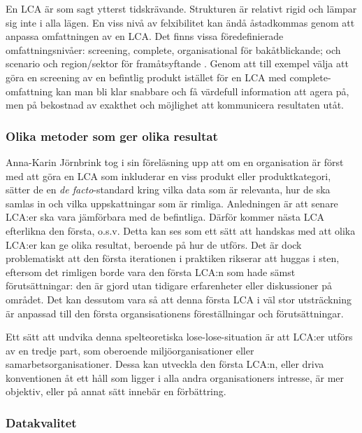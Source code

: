 \documentclass{article}
\begin{document}
En LCA är som sagt ytterst tidskrävande. Strukturen är relativt rigid och lämpar sig inte i alla lägen. En viss nivå av felxibilitet kan ändå åstadkommas genom att anpassa omfattningen av en LCA. Det finns vissa föredefinierade omfattningsnivåer:  screening, complete, organisational för bakåtblickande; och scenario och region/sektor för framåtsyftande . Genom att till exempel välja att göra en screening av en befintlig produkt istället för en LCA med complete-omfattning kan man bli klar snabbare och få värdefull information att agera på, men på bekostnad av exakthet och möjlighet att kommunicera resultaten utåt.

\subsubsection{Olika metoder som ger olika resultat}

Anna-Karin Jörnbrink tog i sin föreläsning upp att om en organisation är först med att göra en LCA som inkluderar en viss produkt eller produktkategori, sätter de en \emph{de facto}-standard kring vilka data som är relevanta, hur de ska samlas in och vilka uppskattningar som är rimliga. Anledningen är att senare LCA:er ska vara jämförbara med de befintliga. Därför kommer nästa LCA efterlikna den första, o.s.v. Detta kan ses som ett sätt att handskas med att olika LCA:er kan ge olika resultat, beroende på hur de utförs. Det är dock problematiskt att den första iterationen i praktiken rikserar att huggas i sten, eftersom det rimligen borde vara den första LCA:n som hade sämst förutsättningar: den är gjord utan tidigare erfarenheter eller diskussioner på området. Det kan dessutom vara så att denna första LCA i väl stor utsträckning är anpassad till den första organsisationens föreställningar och förutsättningar. 

Ett sätt att undvika denna spelteoretiska lose-lose-situation är att LCA:er utförs av en tredje part, som oberoende miljöorganisationer eller samarbetsorganisationer. Dessa kan utveckla den första LCA:n, eller driva konventionen åt ett håll som ligger i alla andra organisationers intresse, är mer objektiv, eller på annat sätt innebär en förbättring.

\subsubsection{Datakvalitet}
\end{document}
